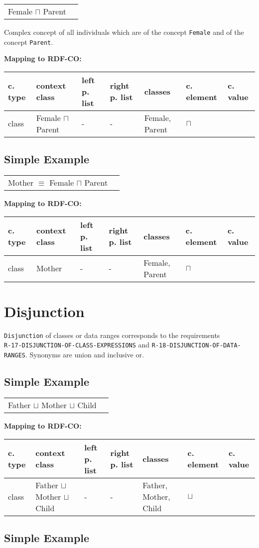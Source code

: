 \documentclass{llncs}
\newcommand{\ms}[1]{\texttt{#1}}
\newenvironment{gcotable}{
  \scriptsize
  \sffamily
  \vspace{0cm}
	\begin{center}
	\textbf{\vspace{0.4cm}Mapping to RDF-CO:} \\
  \begin{tabular}{l|l|l|l|l|l|l}
	\hline
  \textbf{c. type} & \textbf{context class} & \textbf{left p. list} & \textbf{right p. list} & \textbf{classes} & \textbf{c. element} & \textbf{c. value} \\
  \hline

}{
  \hline
  \end{tabular}
	\end{center}
}
\newenvironment{DL}{
  \vspace{0cm}
	\begin{center}
  \begin{tabular}{r l}

}{
  \end{tabular}
	\end{center}
}
\begin{document}
\begin{DL}
Female $\sqcap$ Parent
\end{DL}

Complex concept of all individuals which are of the concept \ms{Female} and of the concept \ms{Parent}.

\begin{gcotable}
class & Female $\sqcap$ Parent & - & - & Female, Parent & $\sqcap$ \\
\end{gcotable}

\subsection{Simple Example}

\begin{DL}
Mother $\equiv$ Female $\sqcap$ Parent
\end{DL}

\begin{gcotable}
class & Mother & - & - & Female, Parent & $\sqcap$ \\
\end{gcotable}

\section{Disjunction}

\ms{Disjunction} of classes or data ranges corresponds to the requirements \\
\ms{R-17-DISJUNCTION-OF-CLASS-EXPRESSIONS} and \ms{R-18-DISJUNCTION-OF-DATA-RANGES}.
Synonyms are union and inclusive or.

\subsection{Simple Example}

\begin{DL}
Father $\sqcup$ Mother $\sqcup$ Child
\end{DL}

\begin{gcotable}
class & Father $\sqcup$ Mother $\sqcup$ Child & - & - & Father, Mother, Child & $\sqcup$ \\
\end{gcotable}

\subsection{Simple Example}
\end{document}
